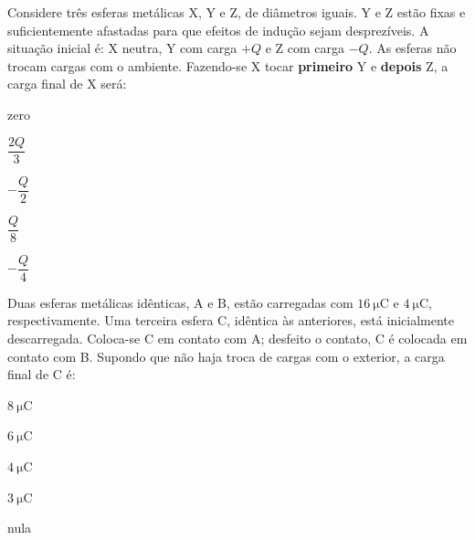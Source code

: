 \begin{questao}[3]{}
Considere três esferas metálicas X, Y e Z, de diâmetros iguais. Y e Z estão fixas
e suficientemente afastadas para que efeitos de indução sejam desprezíveis. A
situação inicial é: X neutra, Y com carga $+Q$ e Z com carga $-Q$. As esferas não
trocam cargas com o ambiente. Fazendo-se X tocar \textbf{primeiro} Y e
\textbf{depois} Z, a carga final de X será:
\begin{alternativas}[2]
\item zero
\item $\dfrac{2Q}{3}$
\item $-\dfrac{Q}{2}$
\item $\dfrac{Q}{8}$
\item $-\dfrac{Q}{4}$
\end{alternativas}
\end{questao}

\begin{questao}[3]{}
Duas esferas metálicas idênticas, A e B, estão carregadas com
$\SI{16}{\micro\coulomb}$ e $\SI{4}{\micro\coulomb}$, respectivamente. Uma terceira
esfera C, idêntica às anteriores, está inicialmente descarregada. Coloca-se C em
contato com A; desfeito o contato, C é colocada em contato com B. Supondo que não
haja troca de cargas com o exterior, a carga final de C é:
\begin{alternativas}[3]
\item $\SI{8}{\micro\coulomb}$
\item $\SI{6}{\micro\coulomb}$
\item $\SI{4}{\micro\coulomb}$
\item $\SI{3}{\micro\coulomb}$
\item nula
\end{alternativas}
\end{questao}

